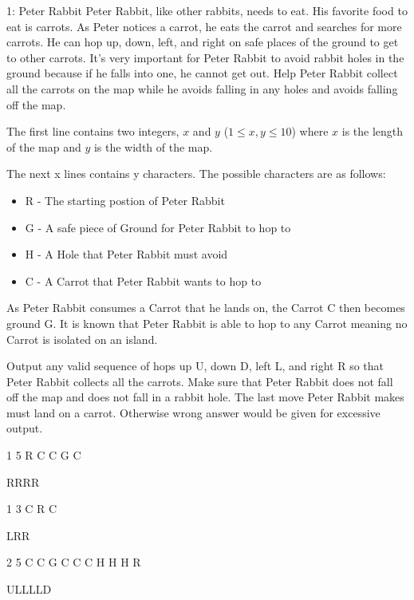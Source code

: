 \begin{problem}{1: Peter Rabbit}
Peter Rabbit, like other rabbits, needs to eat. His favorite food to eat is carrots.
As Peter notices a carrot, he eats the carrot and searches for more carrots.
He can hop up, down, left, and right on safe places of the ground to get to other carrots.
It's very important for Peter Rabbit to avoid rabbit holes in the ground because if he falls into one, he cannot get out.
Help Peter Rabbit collect all the carrots on the map while he avoids falling in any holes and avoids falling off the map.
\end{problem}

\begin{formalin}
The first line contains two integers, $x$ and $y$ ($1 \leq x, y \leq 10$) where $x$ is the length of the map and $y$ is the width of the map.

The next x lines contains y characters. The possible characters are as follows:
\begin{itemize}
\item R - The starting postion of Peter Rabbit
\item G - A safe piece of Ground for Peter Rabbit to hop to
\item H - A Hole that Peter Rabbit must avoid
\item C - A Carrot that Peter Rabbit wants to hop to
\end{itemize}

As Peter Rabbit consumes a Carrot that he lands on, the Carrot C then becomes ground G.
It is known that Peter Rabbit is able to hop to any Carrot meaning no Carrot is isolated on an island.
\end{formalin}

\begin{formalout}
Output any valid sequence of hops up U, down D, left L, and right R so that Peter Rabbit collects all the carrots.
Make sure that Peter Rabbit does not fall off the map and does not fall in a rabbit hole.
The last move Peter Rabbit makes must land on a carrot. Otherwise wrong answer would be given for excessive output.
\end{formalout}

\begin{datain}
1 5
R C C G C
\end{datain}
\begin{dataout}
RRRR
\end{dataout}

\begin{datain}
1 3
C R C
\end{datain}
\begin{dataout}
LRR
\end{dataout}

\begin{datain}
2 5
C C G C C
C H H H R
\end{datain}
\begin{dataout}
ULLLLD
\end{dataout}
